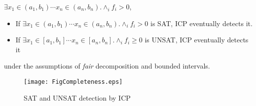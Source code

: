 \begin{comment}
\subsection{Inequalities}
Constraints with inequalities can be categorized into four cases:
\begin{enumerate}
\item \textbf{SAT with without touching}
\begin{figure}[ht]
\centering
\texttt{[image: SAT-withoutTouching.png]} 
\caption{SAT without touching dectected by ICP} 
\label{fig:sat-withoutTouching} 
\end{figure} 

\item \textbf{SAT/UNSAT with touching/convergence}
\begin{figure}[ht]
\centering
\texttt{[image: SAT-touching.png]} 
\caption{SAT(UNSAT) detected by Grobner basis method} 
\label{fig:sat-touching} 
\end{figure} 

\item \textbf{UNSAT without touching/convergence}
\begin{figure}[ht]
\centering
\texttt{[image: UNSAT-withoutTouching.png]} 
\caption{UNSAT detected by ICP} 
\label{fig:unsat-withoutTouching} 
\end{figure} 
\end{enumerate}
\end{comment}

$\exists x_1 \in (a_1,b_1) \cdots x_n \in (a_n,b_n) . \wedge_{i} f_i > 0$, 
\begin{itemize}
\item If $\exists x_1 \in (a_1,b_1) \cdots x_n \in (a_n,b_n) . \wedge_{i} f_i > 0$ is SAT, 
ICP eventually detects it. 
\item If $\exists x_1 \in [a_1,b_1] \cdots x_n \in [a_n,b_n] . \wedge_{i} f_i \geq 0$ is UNSAT, 
ICP eventually detects it
\end{itemize}
under the assumptions of {\em fair} decomposition and bounded intervals. 
\begin{figure}[ht]
\centering
\texttt{[image: FigCompleteness.eps]} 
\caption{SAT and UNSAT detection by ICP} 
\label{fig:complete} 
\end{figure} 

